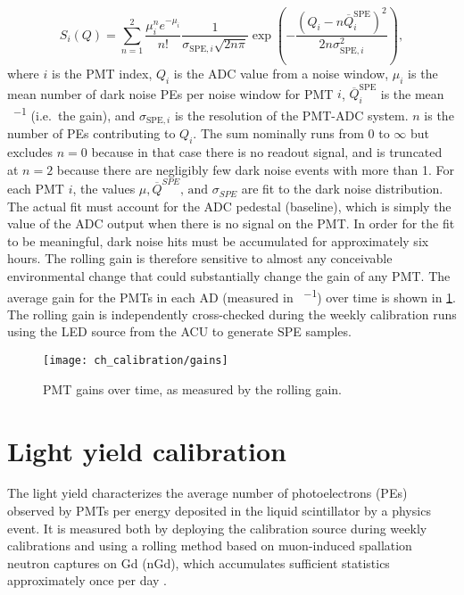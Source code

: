 \begin{equation}
    S_i(Q) = \sum_{n=1}^2 \frac{\mu_i^n e^{-\mu_i}}{n!}
    \frac{1}{\sigma_{\text{SPE},i}\sqrt{2n\pi}}
    \exp
    \left(
        -\frac{(Q_i-n\overline{Q}_i^{\text{SPE}})^2}{2n\sigma^2_{\text{SPE},i}}
    \right),
\end{equation}
where $i$ is the PMT index,
$Q_i$ is the ADC value from a noise window,
$\mu_i$ is the mean number of dark noise PEs per noise window for PMT $i$,
$\overline{Q}_i^{\text{SPE}}$ is the mean \si{\adc\per\pe} (i.e.\ the gain),
and $\sigma_{\text{SPE},i}$ is the resolution of the PMT-ADC system.
$n$ is the number of PEs contributing to $Q_i$.
The sum nominally runs from $0$ to $\infty$ but
excludes $n=0$ because in that case there is no readout signal,
and is truncated at $n=2$ because there are negligibly few dark noise events
with more than \SI{1}{\pe}.
For each PMT $i$, the values $\mu,\overline{Q}^{SPE}\text{, and }\sigma_{SPE}$ are fit
to the dark noise distribution.
The actual fit must account for the ADC pedestal (baseline),
which is simply the value of the ADC output when there is no signal on the PMT.
In order for the fit to be meaningful, dark noise hits must be accumulated
for approximately six hours.
The rolling gain is therefore sensitive to almost any conceivable
environmental change that could substantially change the gain of any PMT.
The average gain for the PMTs in each AD (measured in \si{\adc\per\pe})
over time is shown in \cref{fig:gain}.
The rolling gain is independently cross-checked during the weekly calibration runs
using the LED source from the ACU to generate SPE samples.

\begin{figure}
    \centering
    \texttt{[image: ch\_calibration/gains]}
    \caption{PMT gains over time, as measured by the rolling gain.}
    \label{fig:gain}
\end{figure}


\section{Light yield calibration}
\label{sec:light_yield_calib}

The light yield characterizes the average
number of photoelectrons (PEs) observed by PMTs
per energy deposited in the liquid scintillator
by a physics event.
It is measured both by deploying the  calibration source
during weekly calibrations
and using a rolling method based on muon-induced spallation neutron
captures on Gd (nGd), which accumulates sufficient statistics
approximately once per day .

